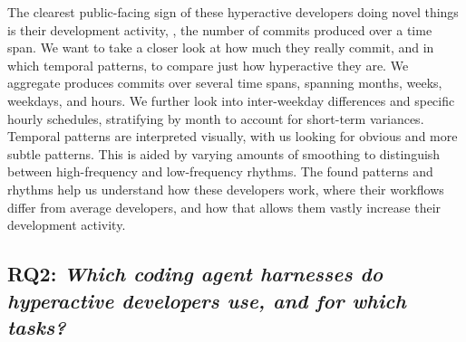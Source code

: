 \documentclass[smallextended]{svjour3}
\begin{document}

The clearest public-facing sign of these hyperactive developers doing novel things is their development activity, \ie, the number of commits produced over a time span. We want to take a closer look at how much they really commit, and in which temporal patterns, to compare just how hyperactive they are.
We aggregate produces commits over several time spans, spanning months, weeks, weekdays, and hours. We further look into inter-weekday differences and specific hourly schedules, stratifying by month to account for short-term variances.
Temporal patterns are interpreted visually, with us looking for obvious and more subtle patterns. This is aided by varying amounts of smoothing to distinguish between high-frequency and low-frequency rhythms.
The found patterns and rhythms help us understand how these developers work, where their workflows differ from average developers, and how that allows them vastly increase their development activity. 


\subsection*{RQ2: \emph{Which coding agent harnesses do hyperactive developers use, and for which tasks?}}

\end{document}
